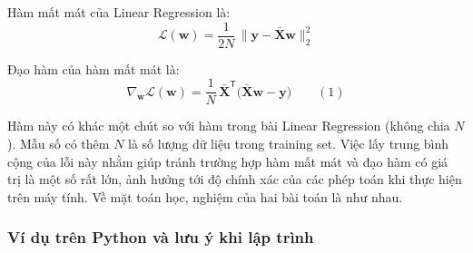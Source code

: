 \begin{congthuc}[title={Hàm mất mát và gradient}]
Hàm mất mát của Linear Regression là:
\[
\mathcal{L}(\mathbf{w}) = \frac{1}{2N}\,\|\mathbf{y} - \bar{\mathbf{X}}\mathbf{w}\|_2^2
\]

Đạo hàm của hàm mất mát là:
\[
\nabla_{\mathbf{w}}\mathcal{L}(\mathbf{w}) = \frac{1}{N}\,\bar{\mathbf{X}}^{\mathsf{T}}\bigl(\bar{\mathbf{X}}\mathbf{w} - \mathbf{y}\bigr) \qquad (1)
\]
\end{congthuc}

\begin{luuy}[title={Hàm mất mát có chia cho $N$}]
Hàm này có khác một chút so với hàm trong bài Linear Regression (không chia $N$). Mẫu số có thêm $N$ là số lượng dữ liệu trong training set. Việc lấy trung bình cộng của lỗi này nhằm giúp tránh trường hợp hàm mất mát và đạo hàm có giá trị là một số rất lớn, ảnh hưởng tới độ chính xác của các phép toán khi thực hiện trên máy tính. Về mặt toán học, nghiệm của hai bài toán là như nhau.
\end{luuy}

\subsubsection{Ví dụ trên Python và lưu ý khi lập trình}

